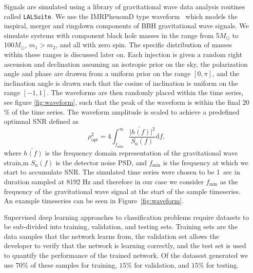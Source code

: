 \documentclass[%
 amsmath,amssymb,
 aps,
 twocolumn,
 prl,
 reprint,
floatfix,
]{revtex4-1}
\begin{document}
%
%
Signals are simulated using a library of gravitational wave data analysis
routines called \texttt{LALSuite}. We use the IMRPhenomD type
waveform~\cite{PhysRevD.93.044006, PhysRevD.93.044007} which models the
inspiral, merger and ringdown components of \ac{BBH} gravitational wave
signals. We simulate systems with component black hole masses in the range from
5\(M_\odot\) to 100\(M_\odot\), $m_{1} > m_{2}$, and all with zero spin. The
specific distribution of masses within these ranges is discussed later on. Each
injection is given a random right ascension and declination assuming an
isotropic prior on the sky, the polarization angle and phase are drawen from a
uniform prior on the range $[0,\pi]$, and the inclination angle is drawn such
that the cosine of inclination is uniform on the range $[-1,1]$. The waveforms
are then randomly placed within the time series, see figure \ref{fig:waveform},
such that the peak of the waveform is within the final $20$\% of the time
series. The waveform amplitude is scaled to achieve a predefined optimnal
\ac{SNR} defined as
%
%
\begin{equation} \label{eq:snr} \rho_{\mathrm{opt}}^{2} = 4
\int_{f_{\mathrm{min}}}^{\infty} \frac{\lvert
\tilde{h(f)}\rvert^{2}}{S_{\mathrm{n}}(f)} \mathrm{d}f, \end{equation}
%
where $\tilde{h(f)}$ is the frequency domain representation of the
gravitational wave strain,m $S_{\mathrm{n}}(f)$ is the detector noise \ac{PSD},
and $f_{\mathrm{min}}$ is the frequency at which we start to accumulate
\ac{SNR}. The simulated time series were chosen to be 1~sec in duration sampled
at 8192 Hz and therefore in our case we consider $f_{\mathrm{min}}$ as the
frequency of the gravitational wave signal at the start of the sample
timeseries. An example timeseries can be seen in Figure~\ref{fig:waveform}. 

%
%
Supervised deep learning approaches to classification problems require
datasets to be sub-divided into training, validation, and testing sets.
Training sets are the data samples that the network learns from, the validation
set allows the developer to verify that the network is learning correctly, and
the test set is used to quantify the performance of the trained network.
Of the datasest generated we use $70\%$ of these samples for training,
$15\%$ for validation, and $15\%$ for testing.
\end{document}
